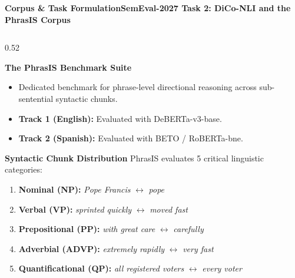 \documentclass[aspectratio=169,10pt]{beamer}
\begin{document}
\begin{frame}{\textbf{Corpus \& Task Formulation}}{\textbf{SemEval-2027 Task 2: DiCo-NLI and the PhrasIS Corpus}}
  \begin{columns}[T]
    \begin{column}{0.52\textwidth}
      \begin{block}{\textbf{The PhrasIS Benchmark Suite}}
        \footnotesize
        \begin{itemize}\setlength{\itemsep}{1pt}\setlength{\parskip}{0pt}
          \item Dedicated benchmark for phrase-level directional reasoning across sub-sentential syntactic chunks.
          \item \textbf{Track 1 (English):} Evaluated with DeBERTa-v3-base.
          \item \textbf{Track 2 (Spanish):} Evaluated with BETO / RoBERTa-bne.
        \end{itemize}
      \end{block}
      \vspace{0.05cm}
      \begin{block}{\textbf{Syntactic Chunk Distribution}}
        \footnotesize
        PhrasIS evaluates 5 critical linguistic categories:
        \begin{enumerate}\setlength{\itemsep}{0pt}\setlength{\parskip}{0pt}\setlength{\topsep}{1pt}
          \item \textbf{Nominal (NP):} \textit{Pope Francis} $\leftrightarrow$ \textit{pope}
          \item \textbf{Verbal (VP):} \textit{sprinted quickly} $\leftrightarrow$ \textit{moved fast}
          \item \textbf{Prepositional (PP):} \textit{with great care} $\leftrightarrow$ \textit{carefully}
          \item \textbf{Adverbial (ADVP):} \textit{extremely rapidly} $\leftrightarrow$ \textit{very fast}
          \item \textbf{Quantificational (QP):} \textit{all registered voters} $\leftrightarrow$ \textit{every voter}
        \end{enumerate}
      \end{block}
    \end{column}


\end{columns}
\end{frame}
\end{document}
